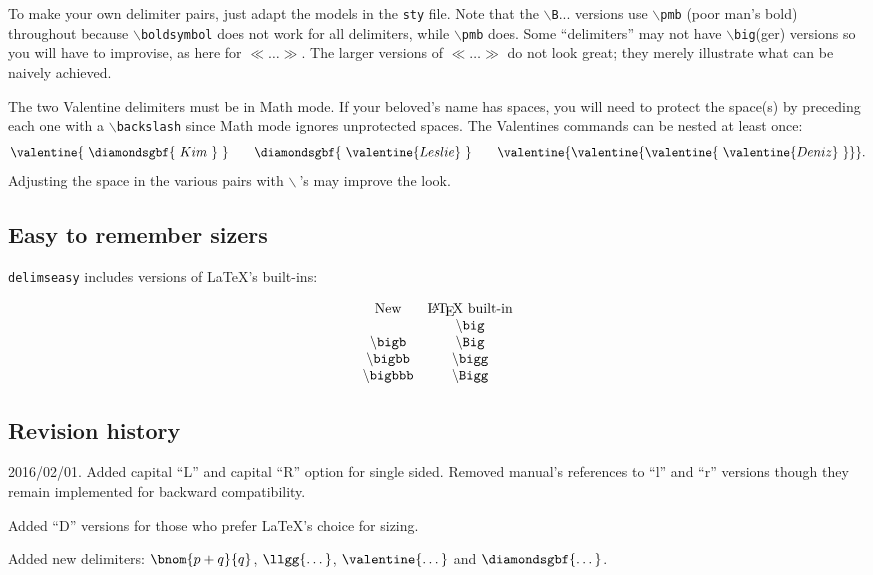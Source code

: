 \documentclass{amsart}
\begin{document}
 To make your own delimiter pairs, just adapt the models in the 
 \texttt{sty} file. 
 Note that the $\backslash$\texttt{B}... versions use
 $\backslash$\texttt{pmb} (poor man's bold)
 throughout because $\backslash$\texttt{boldsymbol}
 does not work for all delimiters, while  $\backslash$\texttt{pmb}
 does. Some ``delimiters'' may not have 
 $\backslash$\texttt{big}(ger) versions so you will have to improvise, as here for
  $\ll\dots\gg$.
The larger versions of  $\ll\dots\gg$  do not look great; they merely illustrate what can be naively
 achieved.
 
 The  two Valentine delimiters  must be in Math mode. If your beloved's name has spaces, 
 you will need to protect
 the space(s) by preceding each one with
  a $\backslash$\texttt{backslash} since
 Math mode ignores unprotected spaces. The Valentines commands can be nested at least once:
 \[
\valentine{\ \diamondsgbf{\ Kim\ }\ }\qquad {\diamondsgbf{\ \valentine{Leslie}\ }}
\qquad\valentine{\valentine{\valentine{\ \valentine{ Deniz }\ }}}.
\]
 Adjusting the space in the various pairs with $\backslash{\ }$'s  may improve the look.
\subsection{Easy to remember sizers}
\texttt{delimseasy} includes 
versions of \LaTeX's 
built-ins:

\[\begin{matrix}
\text{New}&\text{\LaTeX\ built-in}\\
   &\texttt{$\backslash$big}\\
\backslash\texttt{bigb}  &\texttt{$\backslash$Big}\\
\backslash\texttt{bigbb} &\texttt{$\backslash$bigg}\\
\backslash\texttt{bigbbb}&\texttt{$\backslash$Bigg}
\end{matrix}\]
\subsection{Revision history}
2016/02/01. Added capital ``L'' and capital ``R'' option for
single sided. Removed manual's references to ``l'' and ``r'' versions though
they remain implemented for backward compatibility.

Added ``D'' versions for those who prefer \LaTeX's choice for sizing.

Added new delimiters: $\bnom{p+q}{q}$, $\llgg{\dots}$,  $\valentine{\dots}$ and $\diamondsgbf{\dots}$.
\end{document}
